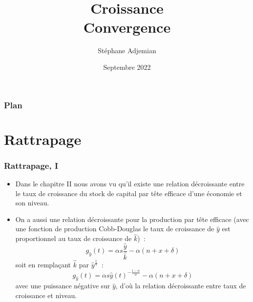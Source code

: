 \documentclass[10pt,notheorems]{beamer}
\theoremstyle{plain}
\theoremstyle{definition} %
\begin{document}
\title{Croissance\\\small{Convergence}}
\author[S. Adjemian]{St\'ephane Adjemian}
\date{Septembre 2022}

\begin{frame}
  \titlepage{}
\end{frame}

\begin{frame}
  \frametitle{Plan}
  \tableofcontents
\end{frame}


\section{Rattrapage}

\begin{frame}
  \frametitle{Rattrapage, I}

  \begin{itemize}

  \item Dans le chapitre II nous avons vu qu'il existe une relation décroissante
    entre le taux de croissance du stock de capital par tête efficace d'une
    économie et son niveau.\newline

  \item On a aussi une relation décroissante pour la production par tête efficace
    (avec une fonction de production Cobb-Douglas le taux de croissance de
    $\hat y$ est proportionnel au taux de croissance de $\hat k$)~:
    \[
      g_{\hat y}(t) = \alpha s  \frac{\hat y}{\hat k} - \alpha (n+x+\delta)
    \]
    soit en remplaçant $\hat k$ par $\hat y^{\frac{1}{\alpha}}$~:
    \[
      g_{\hat y}(t) = \alpha s  \hat y(t)^{-\frac{1-\alpha}{\alpha}} - \alpha (n+x+\delta)
    \]
    avec une puissance négative sur $\hat y$, d'où la relation décroissante
    entre taux de croissance et niveau.

  \end{itemize}

\end{frame}
\end{document}
